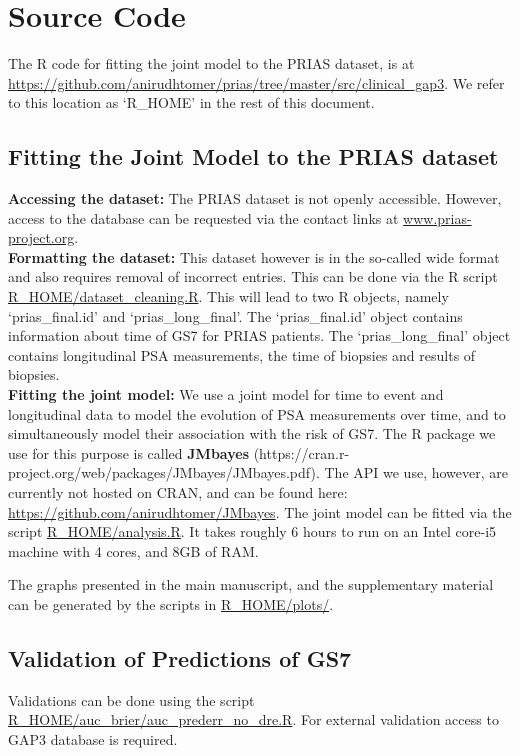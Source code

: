 \section{Source Code}
The R code for fitting the joint model to the PRIAS dataset, is at \url{https://github.com/anirudhtomer/prias/tree/master/src/clinical_gap3}. We refer to this location as `R\_HOME' in the rest of this document.

\subsection{Fitting the Joint Model to the PRIAS dataset}
\textbf{Accessing the dataset:}
The PRIAS dataset is not openly accessible. However, access to the database can be requested via the contact links at \url{www.prias-project.org}.\\

\textbf{Formatting the dataset:}
This dataset however is in the so-called wide format and also requires removal of incorrect entries. This can be done via the R script \url{R_HOME/dataset_cleaning.R}. This will lead to two R objects, namely `prias\_final.id' and `prias\_long\_final'. The `prias\_final.id' object contains information about time of GS7 for PRIAS patients. The `prias\_long\_final' object contains longitudinal PSA measurements, the time of biopsies and results of biopsies.\\

\textbf{Fitting the joint model:}
We use a joint model for time to event and longitudinal data to model the evolution of PSA measurements over time, and to simultaneously model their association with the risk of GS7. The R package we use for this purpose is called \textbf{JMbayes} (https://cran.r-project.org/web/packages/JMbayes/JMbayes.pdf). The API we use, however, are currently not hosted on CRAN, and can be found here:
\url{https://github.com/anirudhtomer/JMbayes}. The joint model can be fitted via the script \url{R_HOME/analysis.R}. It takes roughly 6 hours to run on an Intel core-i5 machine with 4 cores, and 8GB of RAM. 

The graphs presented in the main manuscript, and the supplementary material can be generated by the scripts in \url{R_HOME/plots/}.

\subsection{Validation of Predictions of GS7}
Validations can be done using the script \url{R_HOME/auc_brier/auc_prederr_no_dre.R}. For external validation access to GAP3 database is required.

